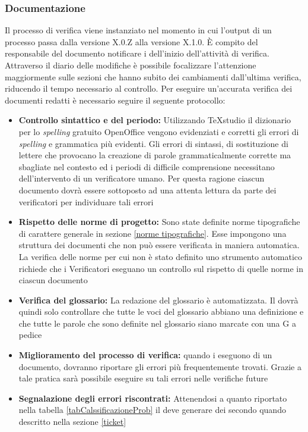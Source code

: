 \documentclass[12pt,a4paper]{article}
\begin{document}
\subsubsection{Documentazione}
Il processo di verifica viene instanziato nel momento in cui l'output di un processo passa dalla versione X.0.Z alla versione X.1.0. È compito del responsabile del documento notificare i \VRpl{} dell'inizio dell'attività di verifica. Attraverso il diario delle modifiche è possibile focalizzare l'attenzione maggiormente sulle sezioni che hanno subito dei cambiamenti dall'ultima verifica, riducendo il tempo necessario al controllo. Per eseguire un'accurata verifica dei documenti redatti è necessario seguire il seguente protocollo:

\begin{itemize}
	\item \textbf{Controllo sintattico e del periodo:} Utilizzando TeXstudio il dizionario per lo \textit{spelling} gratuito OpenOffice vengono evidenziati e corretti gli errori di \textit{spelling} e grammatica più evidenti. Gli errori di sintassi, di sostituzione di lettere che provocano la creazione di parole grammaticalmente corrette ma sbagliate nel contesto ed i periodi di difficile comprensione necessitano dell'intervento di un verificatore umano. Per questa ragione ciascun documento dovrà essere sottoposto ad una attenta lettura da parte dei verificatori per individuare tali errori
	\item \textbf{Rispetto delle norme di progetto:} Sono state definite norme tipografiche di carattere generale in \NdP{} sezione \ref{norme tipografiche}. Esse impongono una struttura dei documenti che non può essere verificata in maniera automatica. La verifica delle norme per cui non è stato definito uno strumento automatico richiede che i Verificatori eseguano un controllo sul rispetto di quelle norme in ciascun documento
	\item \textbf{Verifica del glossario:} La redazione del glossario è automatizzata. Il \VR{} dovrà quindi solo controllare che tutte le voci del glossario abbiano una definizione e che tutte le parole che sono definite nel glossario siano marcate con una G a pedice	
	\item \textbf{Miglioramento del processo di verifica:} quando i \VRpl{} eseguono \emph{} di un documento, dovranno riportare gli errori più frequentemente trovati. Grazie a tale pratica sarà possibile eseguire \emph{} su tali errori nelle verifiche future
	\item \textbf{Segnalazione degli errori riscontrati:} Attenendosi a quanto riportato nella tabella \ref{tabCalssificazioneProb} il \VR{} deve generare dei \textit{} secondo quando descritto nella sezione \ref{ticket}
\end{itemize}
\end{document}
